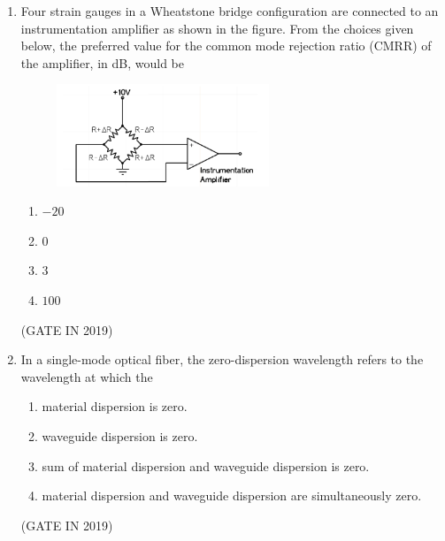 \documentclass[journal]{IEEEtran}
\begin{document}
\begin{enumerate}
\item Four strain gauges in a Wheatstone bridge configuration are connected to an instrumentation amplifier as shown in the figure. From the choices given below, the preferred value for the common mode rejection ratio (CMRR) of the amplifier, in dB, would be
\begin{figure}[H]
    \centering
    \includegraphics[width=0.6\textwidth]{5.png}
    \caption{}
    \label{fig:fig5}
\end{figure}
\begin{multicols}{4}
\begin{enumerate}
\item $-20$
\item $0$
\item $3$
\item $100$
\end{enumerate}
\end{multicols} \hfill(GATE IN 2019)

\item In a single-mode optical fiber, the zero-dispersion wavelength refers to the wavelength at which the
\begin{enumerate}
\item material dispersion is zero.
\item waveguide dispersion is zero.
\item sum of material dispersion and waveguide dispersion is zero.
\item material dispersion and waveguide dispersion are simultaneously zero.
\end{enumerate}
 \hfill(GATE IN 2019)


\end{enumerate}
\end{document}

